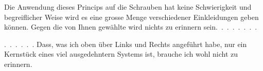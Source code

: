 %
Die Anwendung dieses Princips auf die Schrauben hat keine Schwierigkeit und begreiflicher Weise wird es eine grosse Menge verschiedener Einkleidungen geben k\"onnen. Gegen die von Ihnen gew\"ahlte wird nichts zu erinnern sein.~\mbox{.\ .\ .\ .\ .\ .\ .}

\mbox{.\ .\ .\ .\ .\ .} Dass, was ich oben \"uber Links und Rechts angef\"uhrt habe, nur ein Kernst\"uck eines viel ausgedehntern Systems ist, brauche ich wohl nicht zu erinnern.

\par\bigskip
